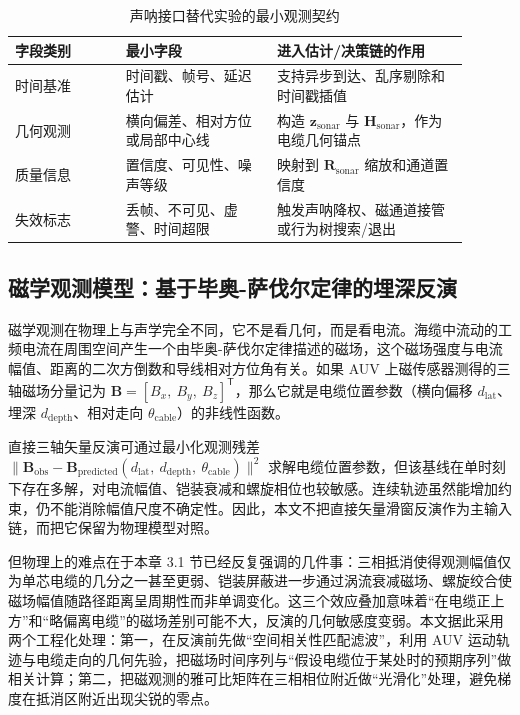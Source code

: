 \begin{table}[htbp]
\centering
\small
\setlength{\tabcolsep}{4pt}
\caption{声呐接口替代实验的最小观测契约}\label{tab:ch03-sonar-substitution-contract}
\begin{tabular}{@{}p{0.22\linewidth}p{0.30\linewidth}p{0.38\linewidth}@{}}
\toprule
字段类别 & 最小字段 & 进入估计/决策链的作用 \\
\midrule
时间基准 & 时间戳、帧号、延迟估计 & 支持异步到达、乱序剔除和时间戳插值 \\
几何观测 & 横向偏差、相对方位或局部中心线 & 构造 \(\boldsymbol{z}_{\mathrm{sonar}}\) 与 \(\boldsymbol{H}_{\mathrm{sonar}}\)，作为电缆几何锚点 \\
质量信息 & 置信度、可见性、噪声等级 & 映射到 \(\boldsymbol{R}_{\mathrm{sonar}}\) 缩放和通道置信度 \\
失效标志 & 丢帧、不可见、虚警、时间超限 & 触发声呐降权、磁通道接管或行为树搜索/退出 \\
\bottomrule
\end{tabular}
\end{table}

\subsection{磁学观测模型：基于毕奥-萨伐尔定律的埋深反演}\label{sec:ch03-3-3-3}

磁学观测在物理上与声学完全不同，它不是看几何，而是看电流。海缆中流动的工频电流在周围空间产生一个由毕奥-萨伐尔定律描述的磁场\cite{griffiths2017electrodynamics,liu2024submarine}，这个磁场强度与电流幅值、距离的二次方倒数和导线相对方位角有关。如果 AUV 上磁传感器测得的三轴磁场分量记为 \(\boldsymbol{B}=[B_x,\ B_y,\ B_z]^{\mathsf{T}}\)，那么它就是电缆位置参数（横向偏移 \(d_{\mathrm{lat}}\)、埋深 \(d_{\mathrm{depth}}\)、相对走向 \(\theta_{\mathrm{cable}}\)）的非线性函数。

直接三轴矢量反演可通过最小化观测残差 \(\lVert\boldsymbol{B}_{\mathrm{obs}}-\boldsymbol{B}_{\mathrm{predicted}}(d_{\mathrm{lat}},\ d_{\mathrm{depth}},\ \theta_{\mathrm{cable}})\rVert^2\) 求解电缆位置参数，但该基线在单时刻下存在多解，对电流幅值、铠装衰减和螺旋相位也较敏感。连续轨迹虽然能增加约束，仍不能消除幅值尺度不确定性。因此，本文不把直接矢量滑窗反演作为主输入链，而把它保留为物理模型对照。

但物理上的难点在于本章 3.1 节已经反复强调的几件事：三相抵消使得观测幅值仅为单芯电缆的几分之一甚至更弱、铠装屏蔽进一步通过涡流衰减磁场、螺旋绞合使磁场幅值随路径距离呈周期性而非单调变化。这三个效应叠加意味着``在电缆正上方''和``略偏离电缆''的磁场差别可能不大，反演的几何敏感度变弱。本文据此采用两个工程化处理：第一，在反演前先做``空间相关性匹配滤波''，利用 AUV 运动轨迹与电缆走向的几何先验，把磁场时间序列与``假设电缆位于某处时的预期序列''做相关计算；第二，把磁观测的雅可比矩阵在三相相位附近做``光滑化''处理，避免梯度在抵消区附近出现尖锐的零点。

